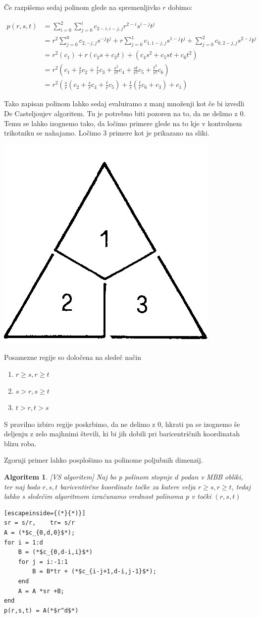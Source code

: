 \documentclass{article}
\newtheorem{algoritm}{Algoritem}[section]
\begin{document}
Če razpišemo sedaj polinom glede na spremenljivko $r$ dobimo:

\begin{align}
p(r,s,t) &= \sum_{i=0}^{2}\sum_{j=0}^{i}c_{2-i,i-j,j}r^{2-i}s^{i-j}t^j \nonumber \\ \nonumber
&= r^2\sum_{j=0}^{0}c_{2,-j,j}s^{-j}t^j + r\sum_{j=0}^{1}c_{1,1-j,j}s^{1-j}t^j + \sum_{j=0}^{2}c_{0,2-j,j}s^{2-j}t^j \\ \nonumber
&= r^2(c_1) + r(c_2s+c_3t) + (c_4s^2+c_5st+c_6t^2)\\ \nonumber
&= r^2(c_1+\frac{s}{r}c_2+\frac{t}{r}c_3+\frac{s^2}{r^2}c_4+\frac{st}{r^2}c_5+\frac{t^2}{r^2}c_6) \\ \nonumber
&= r^2(\frac{s}{r}(c_2+\frac{s}{r}c_4+\frac{t}{r}c_5)+\frac{t}{r}(\frac{t}{r}c_6+c_3)+c_1) \nonumber
\end{align}

Tako zapisan polinom lahko sedaj evaluiramo z manj množenji kot če bi izvedli De Casteljoujev algoritem.
Tu je potrebno biti pozoren na to, da ne delimo z $0$. Temu se lahko izognemo tako, da ločimo primere glede na to kje v kontrolnem trikotniku se nahajamo. Ločimo $3$ primere kot je prikazano na sliki.

\begin{center}
\includegraphics[width=.3\linewidth]{graf1.png}
\end{center}
Posamezne regije so določena na sledeč način
\begin{enumerate}
\item  $r \geq s, r \geq t$
\item $s > r, s \geq t$
\item $t>r, t>s$
\end{enumerate}

S pravilno izbiro regije poskrbimo, da ne delimo z $0$, hkrati pa se izognemo še deljenju z zelo majhnimi števili, ki bi jih dobili pri baricentričnih koordinatah blizu roba.

Zgornji primer lahko posplošimo na polinome poljubnih dimenzij.

\begin{algoritm}
\label{MBB}[VS algoritem]
Naj bo p polinom stopnje $d$ podan v MBB obliki, ter naj bodo $ r,s,t$ baricentirčne koordinate točke za katere velja $r \geq s,r \geq t$, tedaj lahko s sledečim algoritmom izračunamo vrednost polinoma p v točki $(r,s,t)$
\begin{lstlisting}[escapeinside={(*}{*)}]
sr = s/r,	 tr= s/r
A = (*$c_{0,d,0}$*);
for i = 1:d
    B = (*$c_{0,d-i,i}$*)
    for j = i:-1:1
        B = B*tr + (*$c_{i-j+1,d-i,j-1}$*);
    end
    A = A *sr +B;
end
p(r,s,t) = A(*$r^d$*)
\end{lstlisting}
\end{algoritm}
\end{document}
